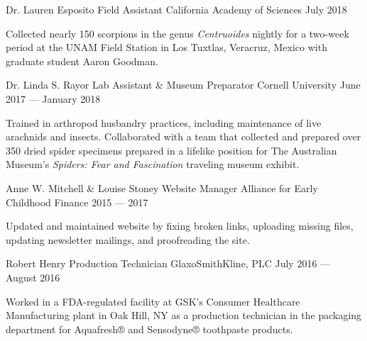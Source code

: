 \begin{cventries}
  \cventry
    {Dr. Lauren Esposito} %
    {Field Assistant} %
    {California Academy of Sciences} %
    {July 2018} %
    {
      \begin{cvitems} %
        \item {Collected nearly 150 scorpions in the genus \textit{Centruoides} nightly for a two-week period at the UNAM Field Station in Los Tuxtlas, Veracruz, Mexico with graduate student Aaron Goodman.}
      \end{cvitems}
    }

  \cventry
    {Dr. Linda S. Rayor} %
    {Lab Assistant \& Museum Preparator} %
    {Cornell University} %
    {June 2017 — January 2018} %
    {
      \begin{cvitems} %
        \item {Trained in arthropod husbandry practices, including maintenance of live arachnids and insects. Collaborated with a team that collected and prepared over 350 dried spider specimens prepared in a lifelike position for The Australian Museum’s \textit{Spiders: Fear and Fascination} traveling museum exhibit.}
      \end{cvitems}
    }

  \cventry
    {Anne W. Mitchell \& Louise Stoney} %
    {Website Manager} %
    {Alliance for Early Childhood Finance} %
    {2015 — 2017} %
    {
      \begin{cvitems} %
        \item {Updated and maintained website by fixing broken links, uploading missing files, updating newsletter mailings, and proofreading the site.}
      \end{cvitems}
    }

  \cventry
    {Robert Henry} %
    {Production Technician} %
    {GlaxoSmithKline, PLC} %
    {July 2016 — August 2016} %
    {
      \begin{cvitems} %
        \item {Worked in a FDA-regulated facility at GSK's Consumer Healthcare Manufacturing plant in Oak Hill, NY as a production technician in the packaging department for Aquafresh®  and Sensodyne® toothpaste products.}
      \end{cvitems}
    }

\end{cventries}
